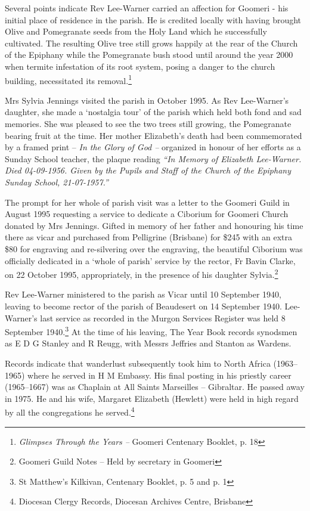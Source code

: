 Several points indicate Rev Lee-Warner carried an affection for Goomeri - his initial place of residence in the parish. He is credited locally with having brought Olive and Pomegranate seeds from the Holy Land which he successfully cultivated. The resulting Olive tree still grows happily at the rear of the Church of the Epiphany while the Pomegranate bush stood until around the year 2000 when termite infestation of its root system, posing a danger to the church building, necessitated its removal.\footnote{\emph{Glimpses Through the Years --} Goomeri Centenary Booklet, p. 18}


Mrs Sylvia Jennings visited the parish in October 1995. As Rev Lee-Warner's daughter, she made a `nostalgia tour' of the parish which held both fond and sad memories. She was pleased to see the two trees still growing, the Pomegranate bearing fruit at the time. Her mother Elizabeth's death had been commemorated by a framed print -- \emph{In the Glory of God --} organized in honour of her efforts as a Sunday School teacher, the plaque reading \emph{``In Memory of Elizabeth Lee-Warner. Died 04-09-1956. Given by the Pupils and Staff of the Church of the Epiphany Sunday School, 21-07-1957.''}



The prompt for her whole of parish visit was a letter to the Goomeri Guild in August 1995 requesting a service to dedicate a Ciborium for Goomeri Church donated by Mrs Jennings. Gifted in memory of her father and honouring his time there as vicar and purchased from Pelligrine (Brisbane) for \$245 with an extra \$80 for engraving and re-silvering over the engraving, the beautiful Ciborium was officially dedicated in a `whole of parish' service by the rector, Fr Bavin Clarke, on 22 October 1995, appropriately, in the presence of his daughter Sylvia.\footnote{Goomeri Guild Notes -- Held by secretary in Goomeri}


\balance


Rev Lee-Warner ministered to the parish as Vicar until 10 September 1940, leaving to become rector of the parish of Beaudesert on 14 September 1940. Lee-Warner's last service as recorded in the Murgon Services Register was held 8 September 1940.\footnote{St Matthew's Kilkivan, Centenary Booklet, p. 5 and p. 1} At the time of his leaving, The Year Book records synodsmen as E D G Stanley and R Reugg, with Messrs Jeffries and Stanton as Wardens.


Records indicate that wanderlust subsequently took him to North Africa (1963--1965) where he served in H M Embassy. His final posting in his priestly career (1965--1667) was as Chaplain at All Saints Marseilles -- Gibraltar. He passed away in 1975. He and his wife, Margaret Elizabeth (Hewlett) were held in high regard by all the congregations he served.\footnote{Diocesan Clergy Records, Diocesan Archives Centre, Brisbane}


